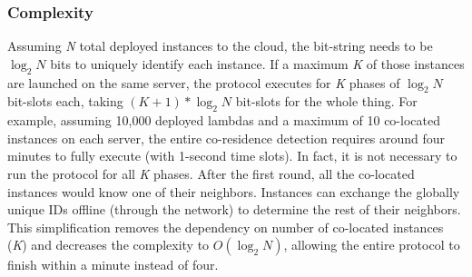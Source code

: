 \subsubsection{Complexity}
\label{sec:protocol:complexity}
Assuming \textit{N} total deployed instances to the cloud, the bit-string needs
to be $\log_2N$ bits to uniquely identify each instance. If a maximum \textit{K}
of those instances are launched on the same server, the protocol executes for
\textit{K} phases of $\log_2N$ bit-slots each, taking $(K+1)*\log_2N$ bit-slots
for the whole thing. For example, assuming 10,000 deployed lambdas and a maximum
of 10 co-located instances on each server, the entire  co-residence detection
requires around four minutes to fully execute (with 1-second time slots).  In fact,
it is not necessary to run the protocol for all \textit{K} phases. After the
first round, all the co-located instances would know one of their neighbors.
 Instances can exchange the globally
unique IDs offline (through the network) to determine the rest of their
neighbors.  This simplification removes the dependency on number of co-located
instances (\textit{K}) and decreases the complexity to $O(\log_2N)$, allowing
the entire protocol to finish within a minute instead of four.


